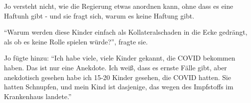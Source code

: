 Jo versteht nicht, wie die Regierung etwas anordnen kann, ohne dass es eine
Haftunh gibt - und sie fragt sich, warum es keine Haftung gibt.

``Warum werden diese Kinder einfach als Kollateralschaden in die Ecke gedrängt,
als ob es keine Rolle spielen würde?'', fragte sie.

Jo fügte hinzu: ``Ich habe viele, viele Kinder gekannt, die COVID bekommen
haben. Das ist nur eine Anekdote. Ich weiß, dass es ernste Fälle gibt, aber
anekdotisch gesehen habe ich 15-20 Kinder gesehen, die COVID hatten. Sie hatten
Schnupfen, und mein Kind ist dasjenige, das wegen des Impfstoffs im Krankenhaus
landete.''

